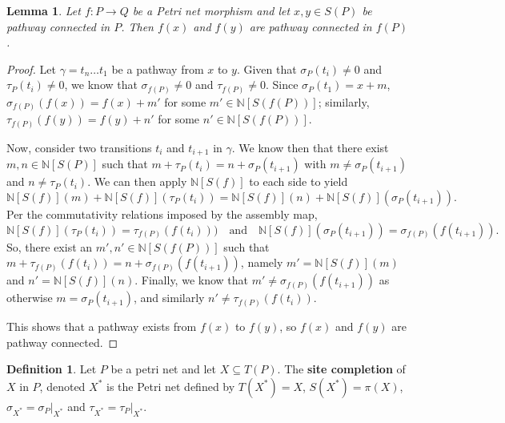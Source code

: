 \documentclass[aps,prd,onecolumn,nofootinbib,letterpaper,preprintnumbers,superscriptaddress,eqsecnum]{revtex4}
\newtheorem{lemma}{Lemma}
\theoremstyle{definition}
\newtheorem{definition}{Definition}
\newcommand{\N}{\mathbb{N}}
\begin{document}
\begin{lemma}\label{lem:image-of-pathways}
    Let $f: P \rightarrow Q$ be a Petri net morphism and let $x, y \in S(P)$ be pathway connected in $P$.
    Then $f(x)$ and $f(y)$ are pathway connected in $f(P)$.
\end{lemma}
\begin{proof}
    Let $\gamma = t_n \ldots t_1$ be a pathway from $x$ to $y$.
    Given that $\sigma_P(t_i) \ne 0$ and $\tau_P(t_i) \ne 0$, we know that $\sigma_{f(P)} \ne 0$ and $\tau_{f(P)} \ne 0$.
    Since $\sigma_P(t_1) = x + m$, $\sigma_{f(P)}(f(x)) = f(x) + m'$ for some $m' \in \N[S(f(P))]$; similarly, $\tau_{f(P)}(f(y)) = f(y) + n'$ for some $n' \in \N[S(f(P))]$.

    Now, consider two transitions $t_i$ and $t_{i+1}$ in $\gamma$.
    We know then that there exist $m, n \in \N[S(P)]$ such that $m + \tau_P(t_i) = n + \sigma_P(t_{i+1})$ with $m \ne \sigma_P(t_{i+1})$ and $n \ne \tau_P(t_i)$.
    We can then apply $\N[S(f)]$ to each side to yield
    \begin{equation*}
        \N[S(f)](m) + \N[S(f)](\tau_P(t_i)) = \N[S(f)](n) + \N[S(f)](\sigma_P(t_{i+1})).
    \end{equation*}
    Per the commutativity relations imposed by the assembly map,
    \begin{equation*}
        \N[S(f)](\tau_P(t_i)) = \tau_{f(P)}(f(t_i)))
        \quad\textrm{and}\quad
        \N[S(f)](\sigma_P(t_{i+1})) = \sigma_{f(P)}(f(t_{i+1})).
    \end{equation*}
    So, there exist an $m', n' \in \N[S(f(P))]$ such that $m + \tau_{f(P)}(f(t_i)) = n + \sigma_{f(P)}(f(t_{i+1}))$, namely $m' = \N[S(f)](m)$ and $n' = \N[S(f)](n)$.
    Finally, we know that $m' \ne \sigma_{f(P)}(f(t_{i+1}))$ as otherwise $m = \sigma_P(t_{i+1})$, and similarly $n' \ne \tau_{f(P)}(f(t_i))$.

    This shows that a pathway exists from $f(x)$ to $f(y)$, so $f(x)$ and $f(y)$ are pathway connected.
\end{proof}

\begin{definition}\label{def:site-completion}
    Let $P$ be a petri net and let $X \subseteq T(P)$.
    The \textbf{site completion} of $X$ in $P$, denoted $X^*$ is the Petri net defined by $T(X^*) = X$, $S(X^*) = \pi(X)$, $\sigma_{X^*} = \sigma_P|_{X^*}$ and $\tau_{X^*} = \tau_P|_{X^*}$.
\end{definition}
\end{document}
